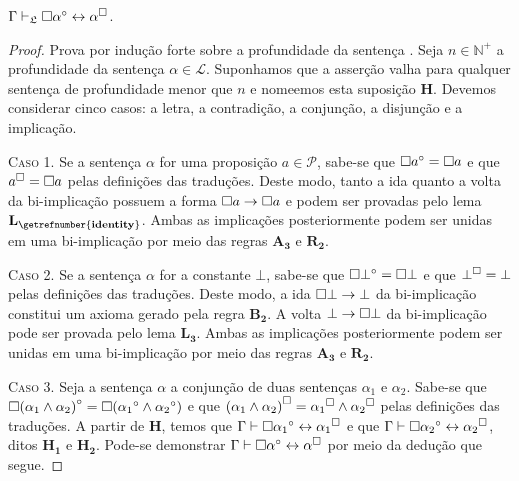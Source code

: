 \begin{tcolorbox}[enhanced jigsaw, breakable, sharp corners, colframe=black, colback=white, boxrule=0.5pt, left=1.5mm, right=1.5mm, top=1.5mm, bottom=1.5mm]
\begin{theorem}\label{isomorphism}
    $\Gamma\mathrel{\vdash}_\mathfrak{L}\Box\alpha^\circ\leftrightarrow\alpha^\Box$.

    \begin{proof}
        Prova por indução forte sobre a profundidade da sentença \citep{Troelstra}.
        Seja $n\in\mathbb{N}^+$ a profundidade da sentença $\alpha\in\mathcal{L}$.
        Suponhamos que a asserção valha para qualquer sentença de profundidade menor que $n$ e nomeemos esta suposição $\mathbf{H}$.
        Devemos considerar cinco casos: a letra, a contradição, a conjunção, a disjunção e a implicação.

        \vspace{.5\baselineskip}
        \textsc{Caso 1.}
        Se a sentença $\alpha$ for uma proposição $a\in\mathcal{P}$, sabe-se que $\Box a^\circ=\Box a$ e que $a^\Box=\Box a$ pelas definições das traduções.
        Deste modo, tanto a ida quanto a volta da bi-implicação possuem a forma $\Box a\to\Box a$ e podem ser provadas pelo lema \hyperref[identity]{$\mathbf{L_\getrefnumber{identity}}$}.
        Ambas as implicações posteriormente podem ser unidas em uma bi-implicação por meio das regras \hyperref[MA3]{$\mathbf{A_3}$} e \hyperref[detachment]{$\mathbf{R_2}$}.

        \vspace{.5\baselineskip}
        \textsc{Caso 2.}
        Se a sentença $\alpha$ for a constante $\bot$, sabe-se que $\Box\bot^\circ=\Box\bot$ e que $\bot^\Box=\bot$ pelas definições das traduções.
        Deste modo, a ida $\Box\bot\to\bot$ da bi-implicação constitui um axioma gerado pela regra \hyperref[MB2]{$\mathbf{B_2}$}.
        A volta $\bot\to\Box\bot$ da bi-implicação pode ser provada pelo lema \hyperref[explosion]{$\mathbf{L_3}$}.
        Ambas as implicações posteriormente podem ser unidas em uma bi-implicação por meio das regras \hyperref[MA3]{$\mathbf{A_3}$} e \hyperref[detachment]{$\mathbf{R_2}$}.

        \vspace{.5\baselineskip}
        \textsc{Caso 3.}
        Seja a sentença $\alpha$ a conjunção de duas sentenças ${\alpha_1}$ e ${\alpha_2}$.
        Sabe-se que $\Box{({\alpha_1}\wedge{\alpha_2})}^\circ=\Box({\alpha_1}^\circ\wedge{\alpha_2}^\circ)$ e que ${({\alpha_1}\wedge{\alpha_2})}^\Box={\alpha_1}^\Box\wedge{\alpha_2}^\Box$ pelas definições das traduções.
        A partir de $\mathbf{H}$, temos que $\Gamma\mathrel{\vdash}\Box{\alpha_1}^\circ\leftrightarrow{\alpha_1}^\Box$ e que $\Gamma\mathrel{\vdash}\Box{\alpha_2}^\circ\leftrightarrow{\alpha_2}^\Box$, ditos $\mathbf{H_1}$ e $\mathbf{H_2}$.
        Pode-se demonstrar $\Gamma\mathrel{\vdash}\Box\alpha^\circ\leftrightarrow\alpha^\Box$ por meio da dedução que segue.


\end{proof}
\end{theorem}
\end{tcolorbox}
